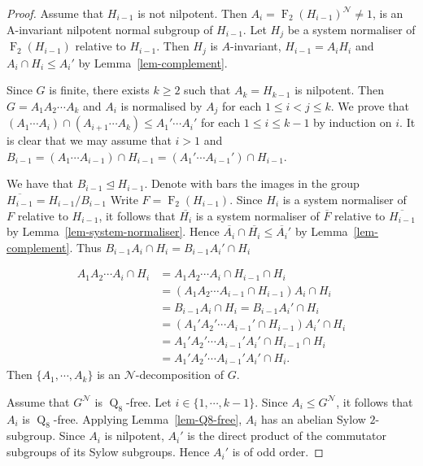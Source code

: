 \documentclass[12pt,a4paper]{article}
\DeclareMathOperator{\Fit}{F}
\DeclareMathOperator{\Q}{Q}
\theoremstyle{definition}
\begin{document}
\begin{proof}
Assume that $H_{i-1}$ is not nilpotent. Then $A_i = \Fit_2(H_{i-1})^{\mathcal{N}} \neq 1$,  is an A-invariant nilpotent normal subgroup of $H_{i-1}$. Let $H_j$ be a system normaliser of
$\Fit_2(H_{i-1})$ relative to $H_{i-1}$. Then $H_j$ is $A$-invariant, $H_{i-1}=A_iH_i$ and $A_i \cap H_i \leq A_i'$ by Lemma~\ref{lem-complement}.

Since $G$ is finite, there exists $k \geq 2$ such that $A_k = H_{k-1}$ is nilpotent. Then $G=A_1A_2\cdots A_k$ and $A_i$ is normalised by $A_j$ for each $1\leq i <j\leq k$. We prove that $(A_1\cdots A_i) \cap (A_{i+1} \cdots A_k) \leq A_1' \cdots A_i'$ for each $1 \leq i \leq k-1$ by induction on $i$. It is clear that we may assume that $i >1$ and $B_{i-1} = (A_1\cdots A_{i-1}) \cap H_{i-1}= ( A_1' \cdots A_{i-1}')  \cap H_{i-1}$.

We have that  $B_{i-1} \unlhd H_{i-1}$. Denote with bars the images in the group $\overline{H_{i-1}}=H_{i-1}/B_{i-1}$ Write $F = \Fit_2(H_{i-1})$. Since $H_i$ is a system normaliser of $F$ relative to $H_{i-1}$, it follows that $\overline{H_{i}}$ is a system normaliser of $\overline{F}$ relative to $\overline{H_{i-1}}$ by  Lemma~\ref{lem-system-normaliser}. Hence $\overline{A_{i}} \cap \overline{H_{i}} \leq \overline{A_{i}}'$ by Lemma~\ref{lem-complement}. Thus $B_{i-1}A_i \cap H_i=B_{i-1}A_i' \cap H_i$

$$
\begin{aligned}
A_1A_2\cdots A_i \cap H_i&= A_1A_2\cdots A_i \cap H_{i-1}\cap H_i\\
&=(A_1A_2 \cdots A_{i-1} \cap H_{i-1})A_i \cap H_i\\
&=B_{i-1}A_i \cap H_i=B_{i-1}A_i' \cap H_i\\
&=(A_1'A_2'\cdots A_{i-1}' \cap H_{i-1})A_i' \cap H_i\\
&=A_1'A_2'\cdots A_{i-1}'A_i' \cap H_{i-1} \cap H_i\\
&=A_1'A_2'\cdots A_{i-1}'A_i' \cap H_i.
\end{aligned}
$$
Then $\{A_1,\cdots,A_k\}$ is an $\mathcal{N}$-decomposition of $G$.

Assume that $G^{\mathcal{N}}$ is $\Q_8$-free. Let $i \in \{1, \cdots, k-1\}$. Since $A_i \leq G^{\mathcal{N}}$, it follows that $A_i$ is $\Q_8$-free. Applying Lemma~\ref{lem-Q8-free}, $A_i$ has an abelian Sylow $2$-subgroup. Since $A_i$ is nilpotent, $A_{i}'$ is the direct product of the commutator subgroups of its Sylow subgroups. Hence $A_{i}'$ is of odd order.
\end{proof}
\end{document}
